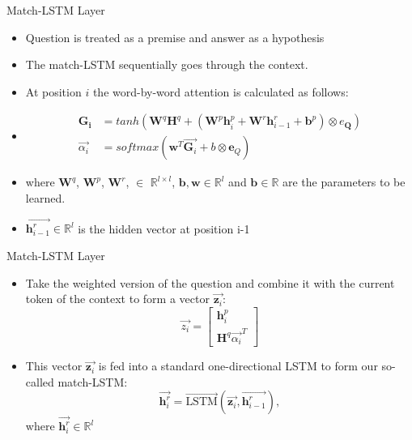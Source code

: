 \documentclass[10pt]{beamer}
\def\*#1{\mathbf{#1}}
\begin{document}
\begin{frame}{Match-LSTM Layer}
	\begin{itemize}[<+- | alert@+>]
		\item Question is treated as a premise and answer as a hypothesis
		\item The match-LSTM sequentially goes through the context.
		\item At position $i$ the word-by-word attention is calculated as follows:
		\item
			\begin{align*}
				\boldsymbol{G_i} &= tanh(\*W^q\*H^q + (\*W^p\*h_i^p+\*W^r\*h_{i-1}^r+\*b^p)\otimes e_{\*Q})\\
				\overrightarrow{\alpha_i} & = softmax(\*w^T\overrightarrow{\*G_i}+b\otimes\*e_Q)
			\end{align*}
		\item where $\*W^q$, $\*W^p$, $\*W^r$, $\in$ $\mathbb{R}^{l\times l}$, $\*b,\*w \in \mathbb{R}^l$ and $\*b \in \mathbb{R}$ are the parameters to be learned.
		\item $\overrightarrow{\*h_{i-1}^{r}} \in \mathbb{R}^l$ is the hidden vector at position i-1
	\end{itemize}
\end{frame}

\begin{frame}{Match-LSTM Layer}
	\begin{itemize}[<+- | alert@+>]
		\item Take the weighted version of the question and combine it with the current token of the context to form a vector $\overrightarrow{\*z_i}$:
			$$\overrightarrow{z_i} =
			\begin{bmatrix}
				\*h_i^p \\ \*H^q\overrightarrow{\alpha_i}^T
			\end{bmatrix}
			$$
		\item This vector $\overrightarrow{\*z_i}$ is fed into a standard one-directional LSTM to form our so-called match-LSTM:
			$$\overrightarrow{\*h_i^r} = \overrightarrow{\text{LSTM}}(\overrightarrow{\*z_i},\overrightarrow{\*h_{i-1}^r}),$$
			where $\overrightarrow{\*h_i^r}\in \mathbb{R}^l$
	\end{itemize}
\end{frame}
\end{document}
